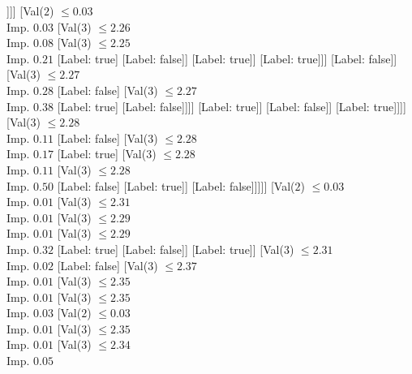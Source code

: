 \documentclass[margin=10pt]{standalone}
\begin{document}
\begin{forest}
																	[Val($3$) $ \leq 2.24$ \\ Imp. $0.12$
																		[Label: false]
																		[Val($3$) $ \leq 2.24$ \\ Imp. $0.50$
																			[Label: true]
																			[Label: false]]]]
																[Val($2$) $ \leq 0.03$ \\ Imp. $0.03$
																	[Val($3$) $ \leq 2.26$ \\ Imp. $0.08$
																		[Val($3$) $ \leq 2.25$ \\ Imp. $0.21$
																			[Label: true]
																			[Label: false]]
																		[Label: true]]
																	[Label: true]]]
															[Label: false]]
														[Val($3$) $ \leq 2.27$ \\ Imp. $0.28$
															[Label: false]
															[Val($3$) $ \leq 2.27$ \\ Imp. $0.38$
																[Label: true]
																[Label: false]]]]
													[Label: true]]
												[Label: false]]
											[Label: true]]]]
								[Val($3$) $ \leq 2.28$ \\ Imp. $0.11$
									[Label: false]
									[Val($3$) $ \leq 2.28$ \\ Imp. $0.17$
										[Label: true]
										[Val($3$) $ \leq 2.28$ \\ Imp. $0.11$
											[Val($3$) $ \leq 2.28$ \\ Imp. $0.50$
												[Label: false]
												[Label: true]]
											[Label: false]]]]]
							[Val($2$) $ \leq 0.03$ \\ Imp. $0.01$
								[Val($3$) $ \leq 2.31$ \\ Imp. $0.01$
									[Val($3$) $ \leq 2.29$ \\ Imp. $0.01$
										[Val($3$) $ \leq 2.29$ \\ Imp. $0.32$
											[Label: true]
											[Label: false]]
										[Label: true]]
									[Val($3$) $ \leq 2.31$ \\ Imp. $0.02$
										[Label: false]
										[Val($3$) $ \leq 2.37$ \\ Imp. $0.01$
											[Val($3$) $ \leq 2.35$ \\ Imp. $0.01$
												[Val($3$) $ \leq 2.35$ \\ Imp. $0.03$
													[Val($2$) $ \leq 0.03$ \\ Imp. $0.01$
														[Val($3$) $ \leq 2.35$ \\ Imp. $0.01$
															[Val($3$) $ \leq 2.34$ \\ Imp. $0.05$

\end{forest}
\end{document}
